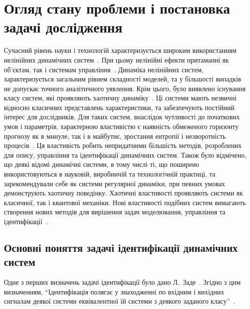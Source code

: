 \chapter{Огляд стану проблеми і постановка задачі дослідження}

Сучасний рівень науки і технологій характеризується широким
використанням нелінійних динамічних систем~\cite{andronov_vitt_haikin,
anisch_nonlin_eff, mishenko_du_small_relax, nonlin_vibro, malinetskii_modern_methods_nl_dyn}. При цьому
нелінійні ефекти притаманні як об'єктам, так і системам
управління~\cite{kubik_nlsc, vukobr_nonadopt}. Динаміка нелінійних систем,
характеризується загальним рівнем складності моделей,
та у більшості випадків не допускає точного аналітичного
уявлення.
Крім цього, було виявлено існування
класу систем, які проявляють
хаотичну динаміку~\cite{moon_chaotic_vibr, magni_theory_dyn_chaos, kuznetsov_dyn_chaos,
neimark_stoch_chaos_vibro, anisch_reg_and_chaotic_vibro}.
Ці системи мають незвичні відносно класичних представлень характеристики, та
забезпечують
постійний інтерес для дослідників.
Для таких систем, внаслідок
чутливості до початкових умов і параметрів, характерною
властивістю є наявність обмеженого горизонту прогнозу як в
минуле, так і в майбутнє, зростання ентропії і незворотність
процесів~\cite{chernavskii_syn_info,prigogine_from_existent,koltsova_nl_dyn_chem}.
Ця властивість робить непридатними більшість методів, розроблених
для опису, управління та ідентифікації динамічних систем. Також
було відмічено, що деякі відомі динамічні системи, в тому числі ті, що
поширено використовуються в науковій, виробничій та технологічній
практиці, та зарекомендували себе як системи регулярної динаміки,
при певних умовах демонструють хаотичну поведінку. Хаотичні
властивості проявляють системи як класичної, так і квантової
механіки. Нові властивості подібних систем вимагають створення
нових методів для вирішення задач моделювання, управління та
ідентифікації~\cite{karabutov_adapt_id_sys,dmitriev_trans_chaos_lowpower}.


\section{Основні поняття задачі ідентифікації динамічних систем} %

Одне з перших визначень задачі ідентифікації було дано
Л.~Заде~\cite{zadeh_id_1956}. Згідно з цим визначенням,
``Ідентифікація полягає у знаходженні по вхідним і вихідних сигналам деякої
системи еквівалентної їй системи з деякого заданого
класу''~\cite{eykhoff_id_base, eykhoff_modern_id, lung_id_sys}.


